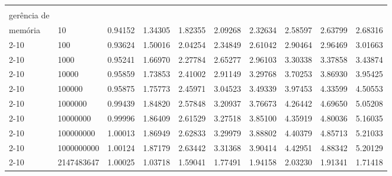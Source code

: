\begin{flushleft}
{\begin{tabular}{|p{1.5cm}|p{1.2cm}|p{1.3cm}|p{1.3cm}|p{1.3cm}|p{1.3cm}|p{1.3cm}|p{1.3cm}|p{1.3cm}|p{1.3cm}|}
\rule{0pt}{4ex}\multirow{9}{*}{\shortstack[l]{\textit{Speedup} sem\\gerência de \\memória}} 
& 10 						& 0.94152 			& 1.34305 			& 1.82355 			& 2.09268 			&  2.32634			& 	2.58597				& 2.63799 			&2.68316 \\\cline{2-10}
&100 						& 0.93624 			& 1.50016 			& 2.04254 			&  2.34849			&  2.61042			&  2.90464			& 2.96469 			& 3.01663\\\cline{2-10}
&1000 					& 0.95241				& 1.66970 			& 2.27784 			&  2.65277			&  2.96103			&  3.30338			& 3.37858 			& 3.43874\\\cline{2-10}
&10000 				& 0.95859			& 1.73853 			& 2.41002 			& 2.91149	 			&  3.29768			&  3.70253			&  3.86930			& 3.95425\\\cline{2-10}
&100000 				& 0.95875				& 1.75773 				& 2.45971 			&  3.04523			&  3.49339			&  3.97453			& 4.33599 			& 4.50553\\\cline{2-10}
&1000000			& 0.99439			& 1.84820 			& 2.57848 			&  3.20937			&  3.76673			&  4.26442			& 4.69650 			& 5.05208\\\cline{2-10}
&10000000 		& 0.99996			& 1.86409 			& 2.61529 			&  3.27518				&  3.85100			&  4.35919			&  4.80036			& 5.16035\\\cline{2-10}
&100000000 		& 1.00013				& 1.86949 			& 2.62833 			&  3.29979			&  3.88802			&  4.40379			&  4.85713			& 5.21033\\\cline{2-10}
&1000000000	& 1.00124				& 1.87179 				& 2.63442 			&  3.31368			&  3.90414			& 4.42951 			&  4.88342			& 5.20129\\\cline{2-10}
&2147483647		& 1.00025				& 1.03718				& 1.59041 			&  1.77491				&  1.94158				&  2.03230			&  1.91341				& 1.71418\\\hline
\end{tabular}
}
\end{flushleft}

